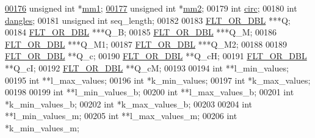 \begin{DoxyCode}
\hypertarget{2Dpfold_8h_source_l00176}{}\hyperlink{structTwoDpfold__vars_a7c9e9af6224d4696118e05835441863d}{00176}   \textcolor{keywordtype}{unsigned} \textcolor{keywordtype}{int}    *\hyperlink{structTwoDpfold__vars_a7c9e9af6224d4696118e05835441863d}{mm1};           
\hypertarget{2Dpfold_8h_source_l00177}{}\hyperlink{structTwoDpfold__vars_affb913470783f9edb12a0bfc22466269}{00177}   \textcolor{keywordtype}{unsigned} \textcolor{keywordtype}{int}    *\hyperlink{structTwoDpfold__vars_affb913470783f9edb12a0bfc22466269}{mm2};           
00179   \textcolor{keywordtype}{int}             \hyperlink{group__model__details_gaf9202a1a09f5828dc731e2d9a10fa111}{circ};
00180   \textcolor{keywordtype}{int}             \hyperlink{group__model__details_ga72b511ed1201f7e23ec437e468790d74}{dangles};
00181   \textcolor{keywordtype}{unsigned} \textcolor{keywordtype}{int}    seq\_length;
00182 
00183   \hyperlink{group__data__structures_ga31125aeace516926bf7f251f759b6126}{FLT\_OR\_DBL}      ***Q;
00184   \hyperlink{group__data__structures_ga31125aeace516926bf7f251f759b6126}{FLT\_OR\_DBL}      ***Q\_B;
00185   \hyperlink{group__data__structures_ga31125aeace516926bf7f251f759b6126}{FLT\_OR\_DBL}      ***Q\_M;
00186   \hyperlink{group__data__structures_ga31125aeace516926bf7f251f759b6126}{FLT\_OR\_DBL}      ***Q\_M1;
00187   \hyperlink{group__data__structures_ga31125aeace516926bf7f251f759b6126}{FLT\_OR\_DBL}      ***Q\_M2;
00188 
00189   \hyperlink{group__data__structures_ga31125aeace516926bf7f251f759b6126}{FLT\_OR\_DBL}      **Q\_c;
00190   \hyperlink{group__data__structures_ga31125aeace516926bf7f251f759b6126}{FLT\_OR\_DBL}      **Q\_cH;
00191   \hyperlink{group__data__structures_ga31125aeace516926bf7f251f759b6126}{FLT\_OR\_DBL}      **Q\_cI;
00192   \hyperlink{group__data__structures_ga31125aeace516926bf7f251f759b6126}{FLT\_OR\_DBL}      **Q\_cM;
00193 
00194   \textcolor{keywordtype}{int}             **l\_min\_values;
00195   \textcolor{keywordtype}{int}             **l\_max\_values;
00196   \textcolor{keywordtype}{int}             *k\_min\_values;
00197   \textcolor{keywordtype}{int}             *k\_max\_values;
00198 
00199   \textcolor{keywordtype}{int}             **l\_min\_values\_b;
00200   \textcolor{keywordtype}{int}             **l\_max\_values\_b;
00201   \textcolor{keywordtype}{int}             *k\_min\_values\_b;
00202   \textcolor{keywordtype}{int}             *k\_max\_values\_b;
00203 
00204   \textcolor{keywordtype}{int}             **l\_min\_values\_m;
00205   \textcolor{keywordtype}{int}             **l\_max\_values\_m;
00206   \textcolor{keywordtype}{int}             *k\_min\_values\_m;

\end{DoxyCode}
